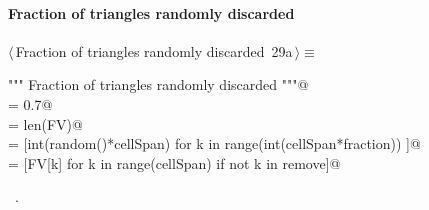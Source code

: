 \documentclass[11pt,oneside]{article}	%
\begin{document}
\paragraph{Fraction of triangles randomly discarded}
\begin{flushleft} \small \label{scrap48}
\protect{}$\langle\,$Fraction of triangles randomly discarded\nobreak\ {\footnotesize 29a}$\,\rangle\equiv$
\vspace{-1ex}
\begin{list}{}{} \item
\mbox{}\verb@""" Fraction of triangles randomly discarded """@\\
\mbox{}\verb@fraction = 0.7@\\
\mbox{}\verb@cellSpan = len(FV)@\\
\mbox{}\verb@remove = [int(random()*cellSpan) for k in range(int(cellSpan*fraction)) ]@\\
\mbox{}\verb@FV = [FV[k] for k in range(cellSpan) if not k in remove]@\\
\mbox{}\verb@@{\NWsep}
\end{list}
\vspace{-1ex}
\footnotesize\addtolength{\baselineskip}{-1ex}
\begin{list}{}{\setlength{\itemsep}{-\parsep}\setlength{\itemindent}{-\leftmargin}}
\item \NWtxtMacroRefIn\ .
\end{list}
\end{flushleft}
\end{document}

